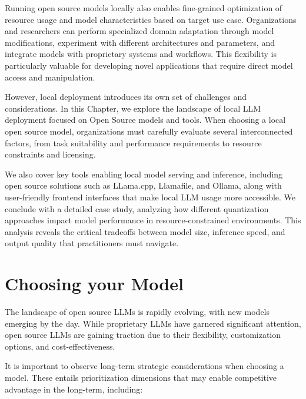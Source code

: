 Running open source models locally also enables fine-grained optimization of resource usage and model characteristics based on target use case. Organizations and researchers can perform specialized domain adaptation through model modifications, experiment with different architectures and parameters, and integrate models with proprietary systems and workflows. This flexibility is particularly valuable for developing novel applications that require direct model access and manipulation. 
 
However, local deployment introduces its own set of challenges and considerations. In this Chapter, we explore the landscape of local LLM deployment focused on Open Source models and tools. When choosing a local open source model, organizations must carefully evaluate several interconnected factors, from task suitability and performance requirements to resource constraints and licensing.
 
We also cover key tools enabling local model serving and inference, including open source solutions such as LLama.cpp, Llamafile, and Ollama, along with user-friendly frontend interfaces that make local LLM usage more accessible. We conclude with a detailed case study, analyzing how different quantization approaches impact model performance in resource-constrained environments. This analysis reveals the critical tradeoffs between model size, inference speed, and output quality that practitioners must navigate.

\section{Choosing your Model}
\label{sec:local-model-selection}

The landscape of open source LLMs is rapidly evolving, with new models emerging by the day. While proprietary LLMs have garnered significant attention, open source LLMs are gaining traction due to their flexibility, customization options, and cost-effectiveness. 

It is important to observe long-term strategic considerations when choosing a model. These entails prioritization dimensions that may enable competitive advantage in the long-term, including:

